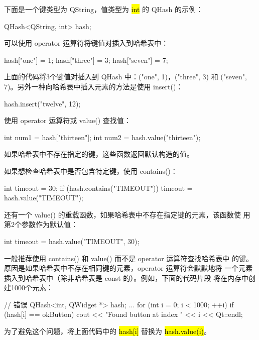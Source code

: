 下面是一个键类型为 QString，值类型为 \hl{int} 的 QHash 的示例：

\begin{cppcode}
QHash<QString, int> hash;
\end{cppcode}


可以使用 operator 运算符将键值对插入到哈希表中：

\begin{cppcode}
hash["one"] = 1;
hash["three"] = 3;
hash["seven"] = 7;
\end{cppcode}

上面的代码将3个键值对插入到 QHash 中：("one", 1)，("three", 3) 和
("seven", 7)。另外一种向哈希表中插入元素的方法是使用 insert()：

\begin{cppcode}
hash.insert("twelve", 12);
\end{cppcode}

使用 operator 运算符或 value() 查找值：

\begin{cppcode}
int num1 = hash["thirteen"];
int num2 = hash.value("thirteen");
\end{cppcode}

如果哈希表中不存在指定的键，这些函数返回默认构造的值。

如果想检查哈希表中是否包含特定键，使用 contains()：

\begin{cppcode}
int timeout = 30;
if (hash.contains("TIMEOUT"))
    timeout = hash.value("TIMEOUT");
\end{cppcode}

还有一个 value() 的重载函数，如果哈希表中不存在指定键的元素，该函数使
用第2个参数作为默认值：

\begin{cppcode}
int timeout = hash.value("TIMEOUT", 30);
\end{cppcode}

一般推荐使用 contains() 和 value() 而不是 operator 运算符查找哈希表中
的键。原因是如果哈希表中不存在相同键的元素，operator 运算符会默默地将
一个元素插入到哈希表中（除非哈希表是 const 的）。例如，下面的代码片段
将在内存中创建1000个元素：


\begin{cppcode}
// 错误
QHash<int, QWidget *> hash;
...
for (int i = 0; i < 1000; ++i) {
    if (hash[i] == okButton)
        cout << "Found button at index " << i << Qt::endl;
}
\end{cppcode}

为了避免这个问题，将上面代码中的 \hl{hash[i]} 替换为 \hl{hash.value(i)}。

